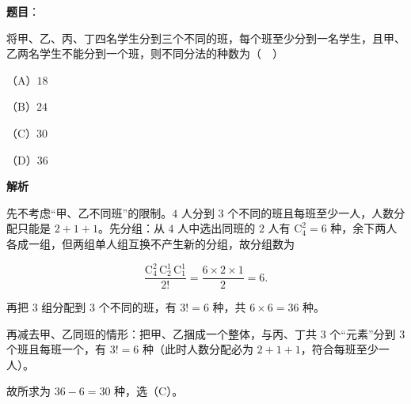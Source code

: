 \begin{answer}

\textbf{题目}：

将甲、乙、丙、丁四名学生分到三个不同的班，每个班至少分到一名学生，且甲、乙两名学生不能分到一个班，则不同分法的种数为（　）

（A）$18$

（B）$24$

（C）$30$

（D）$36$

\textbf{解析}

先不考虑“甲、乙不同班”的限制。$4$ 人分到 $3$ 个不同的班且每班至少一人，人数分配只能是 $2+1+1$。先分组：从 $4$ 人中选出同班的 $2$ 人有 $\mathrm C_4^2=6$ 种，余下两人各成一组，但两组单人组互换不产生新的分组，故分组数为

\nopagebreak[4]
\[\frac{\mathrm C_4^2\,\mathrm C_2^1\,\mathrm C_1^1}{2!}=\frac{6\times2\times1}{2}=6.\]

再把 $3$ 组分配到 $3$ 个不同的班，有 $3!=6$ 种，共 $6\times6=36$ 种。

再减去甲、乙同班的情形：把甲、乙捆成一个整体，与丙、丁共 $3$ 个“元素”分到 $3$ 个班且每班一个，有 $3!=6$ 种（此时人数分配必为 $2+1+1$，符合每班至少一人）。

故所求为 $36-6=30$ 种，选（C）。


\end{answer}

